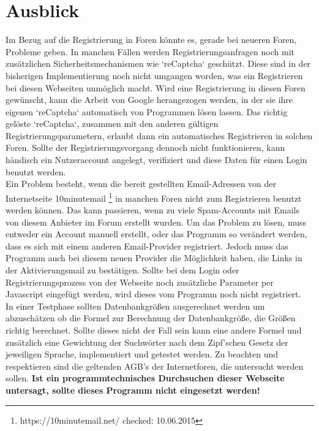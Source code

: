 \section{Ausblick}
Im Bezug auf die Registrierung in Foren könnte es, gerade bei neueren Foren, Probleme geben. In manchen Fällen werden Registrierungsanfragen noch mit zusätzlichen Sicherheitsmechanismen wie `reCaptcha` geschützt. Diese sind in der bisherigen Implementierung noch nicht umgangen worden, was ein Registrieren bei diesen Webseiten unmöglich macht. Wird eine Registrierung in diesen Foren gewünscht, kann die Arbeit von Google herangezogen werden, in der sie ihre eigenen `reCaptcha` automatisch von Programmen lösen lassen\cite{goodfellow2013multi}. Das richtig gelöste `reCaptcha`, zusammen mit den anderen gültigen Registrierungsparametern, erlaubt dann ein automatisches Registrieren in solchen Foren. Sollte der Registrierungsvorgang dennoch nicht funktionieren, kann händisch ein Nutzeraccount angelegt, verifiziert und diese Daten für einen Login benutzt werden.\\
Ein Problem besteht, wenn die bereit gestellten Email-Adressen von der Internetseite 10minutemail \footnote{https://10minutemail.net/ checked: 10.06.2015} in manchen Foren nicht zum Registrieren benutzt werden können. Das kann passieren, wenn zu viele Spam-Accounts mit Emails von diesem Anbieter im Forum erstellt wurden. Um das Problem zu lösen, muss entweder ein Account manuell erstellt, oder das Programm so verändert werden, dass es sich mit einem anderen Email-Provider registriert. Jedoch muss das Programm auch bei diesem neuen Provider die Möglichkeit haben, die Links in der Aktivierungsmail zu bestätigen.
Sollte bei dem Login oder Registrierungsprozess von der Webseite noch zusätzliche Parameter per Javascript eingefügt werden, wird dieses vom Programm noch nicht registriert.\\
In einer Testphase sollten Datenbankgrößen ausgerechnet werden um abzuschätzen ob die Formel zur Berechnung der Datenbankgröße, die Größen richtig berechnet. Sollte dieses nicht der Fall sein kann eine andere Formel und zusätzlich eine Gewichtung der Suchwörter nach dem Zipf'schen Gesetz \cite{leopold2002zipfsche} der jeweiligen Sprache, implementiert und getestet werden\cite{jiang2009selectivity}.
Zu beachten und respektieren sind die geltenden AGB's der Internetforen, die untersucht werden sollen. \textbf{Ist ein programmtechnisches Durchsuchen dieser Webseite untersagt, sollte dieses Programm nicht eingesetzt werden!}

